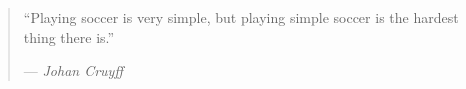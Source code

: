 %
\cleardoublepage
\thispagestyle{empty}

\begin{quote}
\noindent``Playing soccer is very simple, but playing simple soccer is the hardest thing there is.''
	
--- \emph{Johan Cruyff}
\end{quote}

\clearemptydoublepage